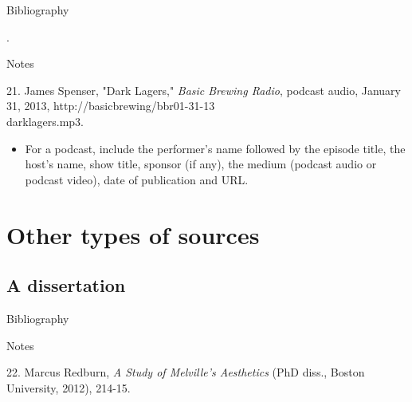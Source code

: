 \begin{center}{Bibliography}\end{center}

\begin{singlespace}
\noindent{}.
\end{singlespace}

\begin{center}{Notes}\end{center} 

\begin{singlespace}
\noindent\hspace{1.2cm}21. James Spenser, "Dark
Lagers," \emph{Basic Brewing Radio}, podcast audio, January 31, 2013,
http://basicbrewing/bbr01-31-13\\darklagers.mp3.
\end{singlespace}

\begin{itemize}\item For a podcast, include the performer's name followed by the
episode title, the host's name, show title, sponsor (if any), the medium
(podcast audio or podcast video), date of publication and URL.\end{itemize}

\section{Other types of sources}

\subsection{A dissertation}

\begin{center}{Bibliography}\end{center}

\begin{singlespace}
\end{singlespace}

\begin{center}{Notes}\end{center} 

\begin{singlespace}
\noindent\hspace{1.2cm}22. Marcus Redburn, \emph{A
Study of Melville's Aesthetics} (PhD diss., Boston University, 2012), 214-15.
\end{singlespace}

